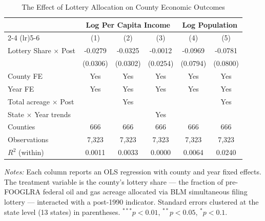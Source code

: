 \begin{table}[htbp]
\centering
\caption{The Effect of Lottery Allocation on County Economic Outcomes}
\label{tab:main}
\begin{tabular}{lccccc}
\hline\hline
 & \multicolumn{3}{c}{Log Per Capita Income} & \multicolumn{2}{c}{Log Population} \\
\cmidrule(lr){2-4} \cmidrule(lr){5-6}
 & (1) & (2) & (3) & (4) & (5) \\
\hline
Lottery Share $\times$ Post & -0.0279 & -0.0325 & -0.0012 & -0.0969 & -0.0781 \\
 & (0.0306) & (0.0302) & (0.0254) & (0.0794) & (0.0800) \\
\addlinespace
County FE & Yes & Yes & Yes & Yes & Yes \\
Year FE & Yes & Yes & Yes & Yes & Yes \\
Total acreage $\times$ Post & & Yes & & & Yes \\
State $\times$ Year trends & & & Yes & & \\
\addlinespace
Counties & 666 & 666 & 666 & 666 & 666 \\
Observations & 7,323 & 7,323 & 7,323 & 7,323 & 7,323 \\
$R^2$ (within) & 0.0011 & 0.0033 & 0.0000 & 0.0064 & 0.0240 \\
\hline\hline
\end{tabular}
\vspace{0.5em}\begin{flushleft}\small
\textit{Notes:} Each column reports an OLS regression with county and year fixed effects. The treatment variable is the county's lottery share --- the fraction of pre-FOOGLRA federal oil and gas acreage allocated via BLM simultaneous filing lottery --- interacted with a post-1990 indicator. Standard errors clustered at the state level (13 states) in parentheses. $^{***}p<0.01$, $^{**}p<0.05$, $^{*}p<0.1$.
\end{flushleft}
\end{table}

